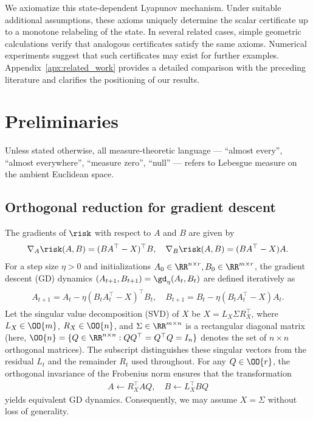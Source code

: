 \documentclass{article}
\begin{document}
We axiomatize this state-dependent Lyapunov mechanism. Under suitable
additional assumptions, these axioms uniquely determine the scalar certificate
up to a monotone relabeling of the state. In several related cases, simple
geometric calculations verify that analogous certificates satisfy the same
axioms. Numerical experiments suggest that such certificates may exist for
further examples.
Appendix~\ref{apx:related_work} provides a detailed comparison with the
preceding literature and clarifies the positioning of our results.

\section{Preliminaries}\label{sec:preliminaries}
Unless stated otherwise, all measure-theoretic language --- ``almost every'',
``almost everywhere'', ``measure zero'', ``null'' --- refers to Lebesgue measure
on the ambient Euclidean space.

\subsection{Orthogonal reduction for gradient descent}\label{subsec:gd_transformation}
The gradients of $\risk$ with respect to $A$ and $B$ are given by
\begin{align}
    \nabla_A \risk (A,B) = (BA^\top - X)^\top B, \quad
    \nabla_B \risk (A,B) = (BA^\top -X)A.
\end{align}
For a step size $\eta > 0$ and initializations
$A_0 \in \RR^{n \times r}, B_0 \in \RR^{m \times r}$, the gradient descent
(GD) dynamics $(A_{t+1}, B_{t+1}) = \gd_\eta(A_t,B_t)$ are defined iteratively as
\begin{align}
    \begin{aligned}
        A_{t+1} = A_t - \eta (B_t A_t^\top - X)^\top B_t, \quad 
        B_{t+1} = B_t - \eta (B_t A_t^\top - X) A_t.
    \end{aligned} \label{eq:gd_dynamics}
\end{align}
Let the singular value decomposition (SVD) of $X$ be $X = L_X \Sigma R_X^\top$, where $L_X \in \OO{m}$, $R_X \in \OO{n}$, and $\Sigma \in \RR^{m \times n}$ is a rectangular diagonal matrix (here, $\OO{n}=\{Q\in \RR^{n\times n}: QQ^\top=Q^\top Q=I_n\}$ denotes the set of $n \times n$ orthogonal matrices). The subscript distinguishes these singular vectors from the residual $L_t$ and the remainder $R_t$ used throughout. For any $Q \in \OO{r}$, the orthogonal invariance of the Frobenius norm ensures that the transformation
\begin{align}
    A \leftarrow R_X^\top A Q, \quad B \leftarrow L_X^\top B Q
\end{align}
yields equivalent GD dynamics. Consequently, we may assume $X = \Sigma$ without loss of generality.
\end{document}
